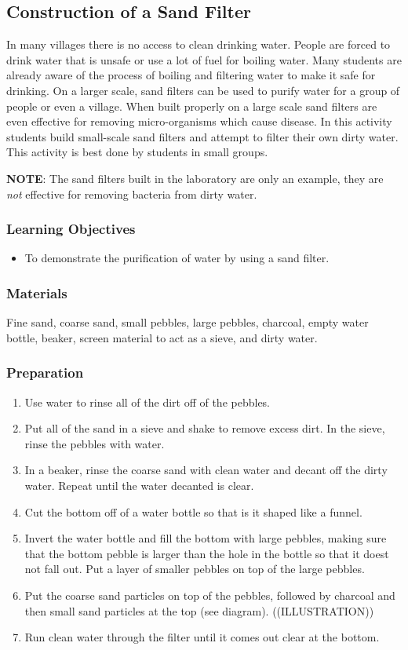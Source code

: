 \subsection{Construction of a Sand Filter}
In many villages there is no access to clean drinking water. People are forced to drink water that is unsafe or use a lot of fuel for boiling water. Many students are already aware of the process of boiling and filtering water to make it safe for drinking. On a larger scale, sand filters can be used to purify water for a group of people or even a village. When built properly on a large scale sand filters are even effective for removing micro-organisms which cause disease. In this activity students build small-scale sand filters and attempt to filter their own dirty water.  This activity is best done by students in small groups.

\textbf{NOTE}: The sand filters built in the laboratory are only an example, they are \textit{not} effective for removing bacteria from dirty water.
\subsubsection*{Learning Objectives}
\begin{itemize}
\item{To demonstrate the purification of water by using a sand filter.}
\end{itemize}

\subsubsection*{Materials}
Fine sand, coarse sand, small pebbles, large pebbles, charcoal, empty water bottle, beaker, screen material to act as a sieve, and dirty water.

\subsubsection*{Preparation}
\begin{enumerate}
\item{Use water to rinse all of the dirt off of the pebbles.}
\item{Put all of the sand in a sieve and shake to remove excess dirt. In the sieve, rinse the pebbles with water.}
\item{In a beaker, rinse the coarse sand with clean water and decant off the dirty water. Repeat until the water decanted is clear.}
\item{Cut the bottom off of a water bottle so that is it shaped like a funnel.}
\item{Invert the water bottle and fill the bottom with large pebbles, making sure that the bottom pebble is larger than the hole in the bottle so that it doest not fall out. Put a layer of smaller pebbles on top of the large pebbles.}
\item{Put the coarse sand particles on top of the pebbles, followed by charcoal and then small sand particles at the top (see diagram).}
((ILLUSTRATION))
\item{Run clean water through the filter until it comes out clear at the bottom.}
\end{enumerate}


